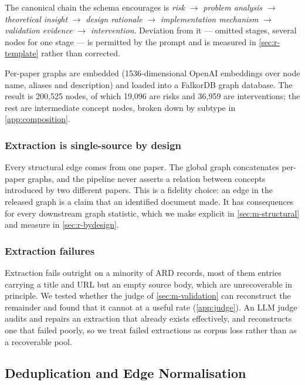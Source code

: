 \documentclass[10pt,twocolumn,letterpaper]{article}
\begin{document}
The canonical chain the schema encourages is \emph{risk} $\rightarrow$ \emph{problem
analysis} $\rightarrow$ \emph{theoretical insight} $\rightarrow$ \emph{design
rationale} $\rightarrow$ \emph{implementation mechanism} $\rightarrow$ \emph{validation
evidence} $\rightarrow$ \emph{intervention}. Deviation from it --- omitted stages,
several nodes for one stage --- is permitted by the prompt and is measured in
\cref{sec:r-template} rather than corrected.

Per-paper graphs are embedded (1536-dimensional OpenAI embeddings over node name,
aliases and description) and loaded into a FalkorDB graph database. The result is
200{,}525 nodes, of which 19{,}096 are risks and 36{,}959 are interventions; the rest are
intermediate concept nodes, broken down by subtype in \cref{app:composition}.

\subsubsection{Extraction is single-source by design}

Every structural edge comes from one paper. The global graph concatenates per-paper
graphs, and the pipeline never asserts a relation between concepts introduced by two
different papers. This is a fidelity choice: an edge in the released graph is a claim
that an identified document made. It has consequences for every downstream graph
statistic, which we make explicit in \cref{sec:m-structural} and measure in
\cref{sec:r-bydesign}.

\subsubsection{Extraction failures}
\label{sec:m-recovery}

Extraction fails outright on a minority of ARD records, most of them entries carrying a
title and URL but an empty source body, which are unrecoverable in principle. We tested
whether the judge of \cref{sec:m-validation} can reconstruct the remainder and found that
it cannot at a useful rate (\cref{app:judge}). An LLM judge audits and repairs an
extraction that already exists effectively, and reconstructs one that failed poorly, so
we treat failed extractions as corpus loss rather than as a recoverable pool.

\subsection{Deduplication and Edge Normalisation}
\label{sec:m-dedup}
\end{document}
